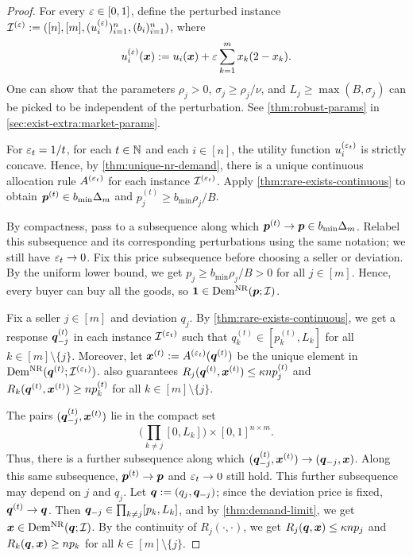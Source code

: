 \begin{proof}
For every $\varepsilon \in [0, 1]$, define the perturbed instance
$\mathcal{I}^{(\varepsilon)} := ([n], [m], (u_i^{(\varepsilon)})_{i=1}^n, (b_i)_{i=1}^n)$, where
\[ u_i^{(\varepsilon)}(\bm{x}) := u_i(\bm{x}) + \varepsilon \sum_{k=1}^m x_k(2-x_k). \]
One can show that the parameters $\rho_j > 0$, $\sigma_j \ge \rho_j/\nu$,
and $L_j \ge \max(B, \sigma_j)$ can be picked to be independent of the perturbation.
See \cref{thm:robust-params} in \cref{sec:exist-extra:market-params}.

For $\varepsilon_t = 1/t$, for each $t \in \mathbb{N}$ and each $i \in [n]$,
the utility function $u_i^{(\varepsilon_t)}$ is strictly concave.
Hence, by \cref{thm:unique-nr-demand}, there is a unique continuous allocation rule
$A^{(\varepsilon_t)}$ for each instance $\mathcal{I}^{(\varepsilon_t)}$.
Apply \cref{thm:rare-exists-continuous} to obtain $\bm{p}^{(t)} \in b_{\min}\Delta_m$
and $p^{(t)}_j \ge b_{\min}\rho_j/B$.

By compactness, pass to a subsequence along which $\bm{p}^{(t)} \to \bm{p} \in b_{\min}\Delta_m$.
Relabel this subsequence and its corresponding perturbations using the same notation;
we still have $\varepsilon_t \to 0$.
Fix this price subsequence before choosing a seller or deviation.
By the uniform lower bound, we get $p_j \ge b_{\min}\rho_j/B > 0$ for all $j \in [m]$.
Hence, every buyer can buy all the goods, so $\mathbf{1} \in \operatorname{Dem^{\mathrm{NR}}}(\bm{p}; \mathcal{I})$.

Fix a seller $j \in [m]$ and deviation $q_j$. By \cref{thm:rare-exists-continuous},
we get a response $\bm{q}_{-j}^{(t)}$ in each instance $\mathcal{I}^{(\varepsilon_t)}$ such that
$q^{(t)}_k \in [p_k^{(t)}, L_k]$ for all $k \in [m] \setminus \{j\}$.
Moreover, let $\bm{x}^{(t)} := A^{(\varepsilon_t)}(\bm{q}^{(t)})$ be the
unique element in $\operatorname{Dem^{\mathrm{NR}}}(\bm{q}^{(t)}; \mathcal{I}^{(\varepsilon_t)})$.
 also guarantees
$R_j(\bm{q}^{(t)}, \bm{x}^{(t)}) \le \kappa n p_j^{(t)}$
and $R_k(\bm{q}^{(t)}, \bm{x}^{(t)}) \ge n p_k^{(t)}$ for all $k \in [m] \setminus \{j\}$.

The pairs $(\bm{q}_{-j}^{(t)}, \bm{x}^{(t)})$ lie in the compact set
\[ \bigg(\prod_{k \neq j} [0, L_k]\bigg) \times [0, 1]^{n \times m}. \]
Thus, there is a further subsequence along which
$(\bm{q}_{-j}^{(t)}, \bm{x}^{(t)}) \to (\bm{q}_{-j}, \bm{x})$.
Along this same subsequence, $\bm{p}^{(t)} \to \bm{p}$ and $\varepsilon_t \to 0$ still hold.
This further subsequence may depend on $j$ and $q_j$.
Let $\bm{q} := (q_j, \bm{q}_{-j})$; since the deviation price is fixed, $\bm{q}^{(t)} \to \bm{q}$.
Then $\bm{q}_{-j} \in \prod_{k \neq j} [p_k, L_k]$, and by \cref{thm:demand-limit}, we get $\bm{x} \in \operatorname{Dem^{\mathrm{NR}}}(\bm{q}; \mathcal{I})$.
By the continuity of $R_j(\cdot, \cdot)$, we get $R_j(\bm{q}, \bm{x}) \le \kappa n p_j$
and $R_k(\bm{q}, \bm{x}) \ge n p_k$ for all $k \in [m] \setminus \{j\}$.
\end{proof}

